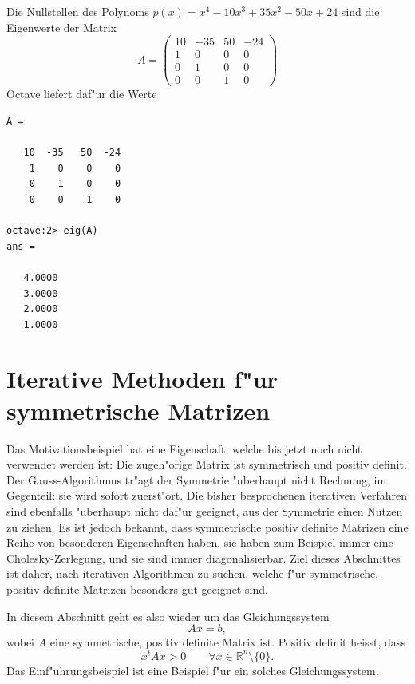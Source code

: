 \begin{beispiel}
Die Nullstellen des Polynoms $p(x)=x^4-10x^3+35x^2-50x+24$ sind die 
Eigenwerte der Matrix
\[
A=\begin{pmatrix}
10&-35&50&-24\\
 1&  0& 0&  0\\
 0&  1& 0&  0\\
 0&  0& 1&  0
\end{pmatrix}
\]
Octave liefert daf"ur die Werte 
\begin{verbatim}
A =

   10  -35   50  -24
    1    0    0    0
    0    1    0    0
    0    0    1    0

octave:2> eig(A)
ans =

   4.0000
   3.0000
   2.0000
   1.0000

\end{verbatim}
\end{beispiel}

\section{Iterative Methoden f"ur symmetrische Matrizen}
Das Motivationsbeispiel hat eine Eigenschaft, welche bis jetzt noch
nicht verwendet werden ist:
Die zugeh"orige Matrix ist symmetrisch und positiv definit.
Der Gauss-Algorithmus tr"agt der Symmetrie "uberhaupt nicht Rechnung,
im Gegenteil: sie wird sofort zuerst"ort.
Die bisher besprochenen iterativen Verfahren sind ebenfalls "uberhaupt
nicht daf"ur geeignet, aus der Symmetrie einen Nutzen zu ziehen.
Es ist jedoch bekannt, dass symmetrische positiv definite Matrizen
eine Reihe von besonderen Eigenschaften haben, sie haben zum Beispiel
immer eine Cholesky-Zerlegung, und sie sind immer diagonalisierbar.
Ziel dieses Abschnittes ist daher, nach iterativen Algorithmen zu
suchen, welche f"ur symmetrische, positiv definite Matrizen besonders
gut geeignet sind.

In diesem Abschnitt geht es also wieder um das Gleichungssystem
\[
Ax=b,
\]
wobei $A$ eine symmetrische, positiv definite Matrix ist.
Positiv definit heisst, dass 
\[
x^tAx > 0\qquad \forall x\in\mathbb R^n\setminus\{0\}.
\]
Das Einf"uhrungsbeispiel ist eine Beispiel f"ur ein solches Gleichungssystem.

